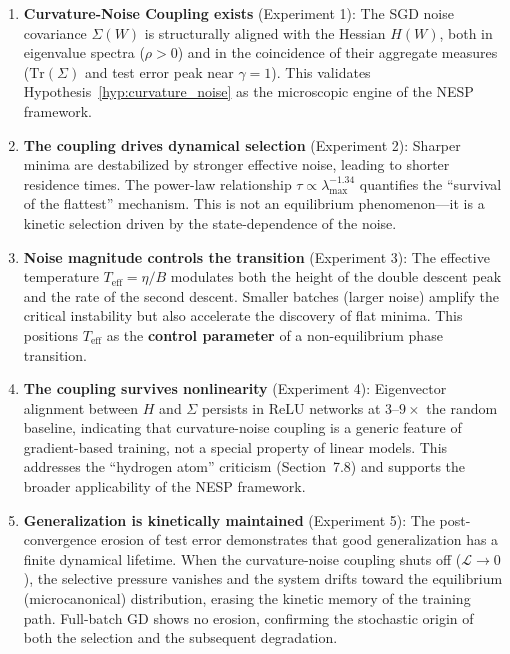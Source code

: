 \documentclass[
  journal=largetwo,
  year=2025,
  volume=37,
]{cup-journal}
\begin{document}
\begin{enumerate}
    \item \textbf{Curvature-Noise Coupling exists} (Experiment 1): The SGD noise covariance $\Sigma(W)$ is structurally aligned with the Hessian $H(W)$, both in eigenvalue spectra ($\rho > 0$) and in the coincidence of their aggregate measures ($\mathrm{Tr}(\Sigma)$ and test error peak near $\gamma = 1$). This validates Hypothesis~\ref{hyp:curvature_noise} as the microscopic engine of the NESP framework.

    \item \textbf{The coupling drives dynamical selection} (Experiment 2): Sharper minima are destabilized by stronger effective noise, leading to shorter residence times. The power-law relationship $\tau \propto \lambda_{\max}^{-1.34}$ quantifies the ``survival of the flattest'' mechanism. This is not an equilibrium phenomenon---it is a kinetic selection driven by the state-dependence of the noise.

    \item \textbf{Noise magnitude controls the transition} (Experiment 3): The effective temperature $T_{\mathrm{eff}} = \eta/B$ modulates both the height of the double descent peak and the rate of the second descent. Smaller batches (larger noise) amplify the critical instability but also accelerate the discovery of flat minima. This positions $T_{\mathrm{eff}}$ as the \textbf{control parameter} of a non-equilibrium phase transition.

    \item \textbf{The coupling survives nonlinearity} (Experiment 4): Eigenvector alignment between $H$ and $\Sigma$ persists in ReLU networks at $3$--$9\times$ the random baseline, indicating that curvature-noise coupling is a generic feature of gradient-based training, not a special property of linear models. This addresses the ``hydrogen atom'' criticism (Section~7.8) and supports the broader applicability of the NESP framework.

    \item \textbf{Generalization is kinetically maintained} (Experiment 5): The post-convergence erosion of test error demonstrates that good generalization has a finite dynamical lifetime. When the curvature-noise coupling shuts off ($\mathcal{L} \to 0$), the selective pressure vanishes and the system drifts toward the equilibrium (microcanonical) distribution, erasing the kinetic memory of the training path. Full-batch GD shows no erosion, confirming the stochastic origin of both the selection and the subsequent degradation.
\end{enumerate}
\end{document}
